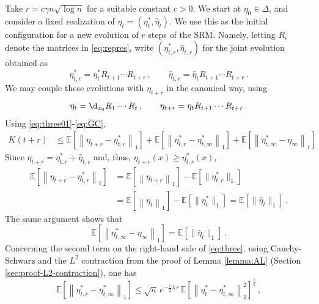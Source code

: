 \documentclass[11pt,reqno]{amsart}
\theoremstyle{remark}
\theoremstyle{definition}
\numberwithin{equation}{section}
\numberwithin{figure}{section}
\newcommand{\E}{\mathds{E}}
\let\D=\Delta \let\F=\Phi  \let\G=\Gamma  \let\L=\Lambda \let\The=\Theta
\begin{document}
	
	Take $r=c\gamma n\sqrt{\log n}$ for a suitable constant $c>0$. We start at $\eta_0\in \D$, 
	and consider a fixed realization of $\eta_t=(\eta_{t}^{*},\widehat \eta_t)$. We use this as the initial configuration for a new evolution of $r$ steps of the SRM. Namely, letting $R_i$ denote the matrices in \eqref{eq:repres}, write $(\eta_{t,r}^*,\widehat\eta_{t,r})$ for the joint evolution obtained as
	\begin{equation}
\eta_{t,r}^*=\eta_{t}^*R_{t+1}\cdots R_{t+r}\,,\qquad \widehat\eta_{t,r}=\widehat\eta_{t}R_{t+1}\cdots R_{t+r}\,.
	\end{equation}
	We may couple these evolutions with $\eta_{t+r}$ in the canonical way, using 
	\begin{equation}\label{eq:GC}
\eta_{t}=\d_{x_0}R_{1}\cdots R_{t}\,,\qquad \eta_{t+r}=\eta_{t}R_{t+1}\cdots R_{t+r}\,.
	\end{equation}
Using \eqref{eq:three01}-\eqref{eq:GC}, 
	\begin{align}\label{eq:three}
K(t+r) & \le 
			\E\left[\left\|\eta_{t+r}-\eta_{t,r}^*\right\|_1\right] + \E\left[\left\|\eta_{t,r}^*-\eta_{t,\infty}^*\right\|_1\right]+ \E\left[\left\|\eta_{t,\infty}^*-\eta_\infty\right\|_1\right]
	\end{align}
Since  $\eta_{t+r}=\eta_{t,r}^*+\widehat\eta_{t,r}$ and, thus,
$\eta_{t+r}(x)\ge \eta_{t,r}^*(x)$, 
	\begin{align}
		\E\left[\left\|\eta_{t+r}-\eta_{t,r}^*\right\|_1\right] 
		& = \E\left[\left\|\eta_{t+r} \right\|_1 \right]- \E\left[\|\eta_{t,r}^*  \|_1 \right]
		\\
		& = \E\left[\left\|\eta_{t} \right\|_1 \right]- \E\left[\|\eta_{t}^*  \|_1 \right]=
		\E\left[\|\widehat\eta_t  \|_1 \right]\,.
	\label{eq:pezzo1}
	\end{align}
	The same argument shows that 
	\begin{equation}\label{eq:pezzo3}
	\E\left[\left\|\eta_{t,\infty}^*-\eta_\infty\right\|_1\right]
=\E\left[\|\widehat\eta_t  \|_1 \right]\,.
	\end{equation}
	Concerning the second term on the right-hand side of \eqref{eq:three}, using Cauchy-Schwarz and 
	 the $L^2$ contraction from the proof of Lemma \ref{lemma:AL} (Section \ref{sec:proof-L2-contraction}), one has 
	\begin{equation}\label{eq:l2bo}
		\E\left[\left\|\eta_{t,r}^*-\eta_{t,\infty}^*\right\|_1\right]
		\le \sqrt n \,e^{-\frac12\lambda \,r}\,\E\left[\left\|\eta_{t}^*-\eta_{t,\infty}^*\right\|^2_2\right]^{\frac12}\,,
	\end{equation}
\end{document}
